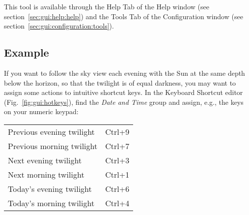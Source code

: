 This tool is available through the Help Tab of the Help window (see section~\ref{sec:gui:help:help}) and the
Tools Tab of the Configuration window (see section~\ref{sec:gui:configuration:tools}).

\subsection{Example}
\label{sec:gui:help:hotkeys:example}

If you want  to follow the sky view each evening
with the Sun at the same depth below the horizon, so that the twilight
is of equal darkness, you may want to assign some actions to intuitive
shortcut keys. In the Keyboard Shortcut editor
(Fig.~\ref{fig:gui:hotkeys}), find the \emph{Date and Time} group and
assign, e.g., the keys on your numeric keypad:

\begin{tabular}{ll}
  Previous evening twilight & Ctrl+9 \\
  Previous morning twilight & Ctrl+7 \\
  Next evening twilight     & Ctrl+3 \\
  Next morning twilight     & Ctrl+1 \\
  Today's evening twilight  & Ctrl+6 \\
  Today's morning twilight  & Ctrl+4 \\
\end{tabular}









